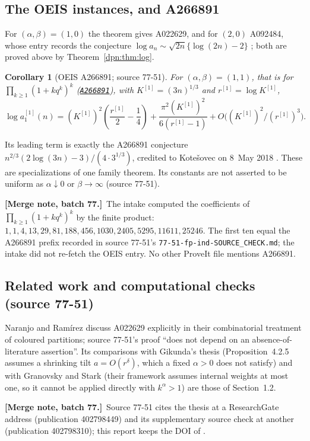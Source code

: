 \documentclass[11pt]{article}
\numberwithin{equation}{section}
\newtheorem{corollary}[theorem]{Corollary}
\theoremstyle{definition}\newtheorem{definition}[theorem]{Definition}
\theoremstyle{remark}\newtheorem{remark}[theorem]{Remark}
\newcommand{\OEIS}[1]{\href{https://oeis.org/#1}{\texttt{#1}}}
\newcommand{\src}[1]{\textup{(source #1)}}
\newcommand{\file}[1]{\nolinkurl{#1}}
\newcommand{\mergenotec}[1]{\par\smallskip\noindent\textbf{[Merge note, batch 77.]}\ #1\par\smallskip}
\begin{document}
\subsection{The OEIS instances, and A266891}\label{dpn:fp:sec:oeis}
For $(\alpha,\beta)=(1,0)$ the theorem gives A022629, and for $(2,0)$ A092484,
whose entry records the conjecture $\log a_n\sim\sqrt{2n}\{\log(2n)-2\}$
\cite{oeis2}; both are proved above by Theorem~\ref{dpn:thm:log}.
\begin{corollary}[OEIS A266891; source 77-51]\label{dpn:fp:cor:a266891}
For $(\alpha,\beta)=(1,1)$, that is for $\prod_{k\ge1}(1+kq^k)^k$
(\OEIS{A266891}), with $K^{[1]}=(3n)^{1/3}$ and $r^{[1]}=\log K^{[1]}$,
\begin{equation}\label{dpn:fp:eq:a266891}
 \log a^{[1]}_1(n)=(K^{[1]})^2\left(\frac{r^{[1]}}2-\frac14\right)
 +\frac{\pi^2(K^{[1]})^2}{6(r^{[1]}-1)}+O\bigl((K^{[1]})^2/(r^{[1]})^3\bigr).
\end{equation}
\end{corollary}
Its leading term is exactly the A266891 conjecture
$n^{2/3}(2\log(3n)-3)/(4\cdot3^{1/3})$, credited to Kote\v{s}ovec on
8~May 2018 \cite{oeis266891}.  These are specializations of one family
theorem.  Its constants are not asserted to be uniform as $\alpha\downarrow0$
or $\beta\to\infty$ \src{77-51}.
\mergenotec{The intake computed the coefficients of $\prod_{k\ge1}(1+kq^k)^k$
by the finite product: $1,1,4,13,29,81,188,456,1030,2405,5295,11611,25246$.
The first ten equal the A266891 prefix recorded in source 77-51's
\file{77-51-fp-ind-SOURCE_CHECK.md}; the intake did not re-fetch the OEIS
entry.  No other ProveIt file mentions A266891.}

\subsection{Related work and computational checks \src{77-51}}\label{dpn:fp:sec:checks}
Naranjo and Ram\'irez \cite{NR} discuss A022629 explicitly in their
combinatorial treatment of coloured partitions; source 77-51's proof ``does
not depend on an absence-of-literature assertion''.  Its comparisons with
Gikunda's thesis \cite{gikunda} (Proposition~4.2.5 assumes a shrinking tilt
$a=O(r^\delta)$, which a fixed $\alpha>0$ does not satisfy) and with
Granovsky and Stark \cite{GS} (their framework assumes internal weights at
most one, so it cannot be applied directly with $k^\alpha>1$) are those of
Section~1.2.
\mergenotec{Source 77-51 cites the thesis at a ResearchGate address
(publication 402798449) and its supplementary source check at another
(publication 402798310); this report keeps the DOI of \cite{gikunda}.}
\end{document}
